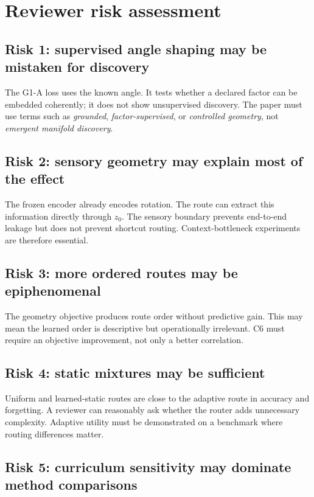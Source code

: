 \documentclass[11pt,a4paper]{article}
\begin{document}
\section{Reviewer risk assessment}

\subsection{Risk 1: supervised angle shaping may be mistaken for discovery}

The G1-A loss uses the known angle. It tests whether a declared factor can be embedded coherently; it does not show unsupervised discovery. The paper must use terms such as \emph{grounded}, \emph{factor-supervised}, or \emph{controlled geometry}, not \emph{emergent manifold discovery}.

\subsection{Risk 2: sensory geometry may explain most of the effect}

The frozen encoder already encodes rotation. The route can extract this information directly through $z_0$. The sensory boundary prevents end-to-end leakage but does not prevent shortcut routing. Context-bottleneck experiments are therefore essential.

\subsection{Risk 3: more ordered routes may be epiphenomenal}

The geometry objective produces route order without predictive gain. This may mean the learned order is descriptive but operationally irrelevant. C6 must require an objective improvement, not only a better correlation.

\subsection{Risk 4: static mixtures may be sufficient}

Uniform and learned-static routes are close to the adaptive route in accuracy and forgetting. A reviewer can reasonably ask whether the router adds unnecessary complexity. Adaptive utility must be demonstrated on a benchmark where routing differences matter.

\subsection{Risk 5: curriculum sensitivity may dominate method comparisons}
\end{document}
